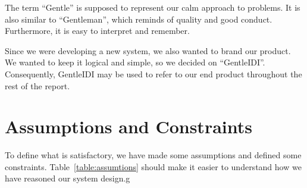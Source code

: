 The term ``Gentle'' is supposed to
represent our calm approach to problems. It is also similar to
``Gentleman'', which reminds of quality and good conduct. Furthermore, it is
easy to interpret and remember.

Since we were developing a new system, we also wanted to brand our product. We
wanted to keep it logical and simple, so we decided on ``GentleIDI''.
Consequently, GentleIDI may be used to refer to our end product throughout the
rest of the report.


\section{Assumptions and Constraints}
\label{sec:assumtions}
To define what is satisfactory, we have made some assumptions and
defined some constraints. Table~\ref{table:assumtions} should make it easier to
understand how we have reasoned our system design.g

